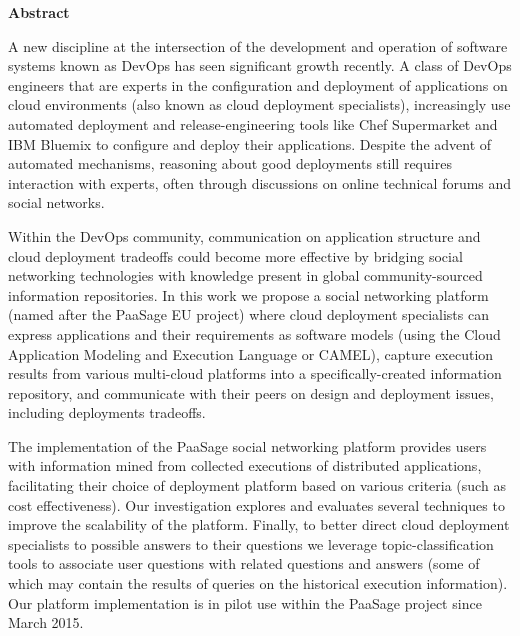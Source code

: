 \thispagestyle{empty}
\begin{titlepage}
\begin{center}
{\bf\Large Abstract}\\
\end{center}

\indent A new discipline at the intersection of the development and operation of software systems known as DevOps has seen significant growth recently. A class of DevOps engineers that are experts in the configuration and deployment of applications on cloud environments (also known as cloud deployment specialists), increasingly use automated deployment and release-engineering tools like Chef Supermarket and IBM Bluemix to configure and deploy their applications.  Despite the advent of automated mechanisms, reasoning about good deployments still requires interaction with experts, often through discussions on online technical forums and social networks. 

Within the DevOps community, communication on application structure and cloud deployment tradeoffs could become more effective by bridging social networking technologies with knowledge present in global community-sourced information repositories.  In this work we propose a social networking platform (named after the PaaSage EU project) where cloud deployment specialists can express applications and their requirements as software models (using the Cloud Application Modeling and Execution Language or CAMEL), capture execution results from various multi-cloud platforms into a specifically-created information repository, and communicate with their peers on design and deployment issues, including deployments tradeoffs.

The implementation of the PaaSage social networking platform provides users with information mined from collected executions of distributed applications, facilitating their choice of deployment platform based on various criteria (such as cost effectiveness). Our investigation explores and evaluates several techniques to improve the scalability of the platform.  Finally, to better direct cloud deployment specialists to possible answers to their questions we leverage topic-classification tools to associate user questions with related questions and answers (some of which may contain the results of queries on the historical execution information). Our platform implementation is in pilot use within the PaaSage project since March 2015.

\vfill
\end{titlepage}

